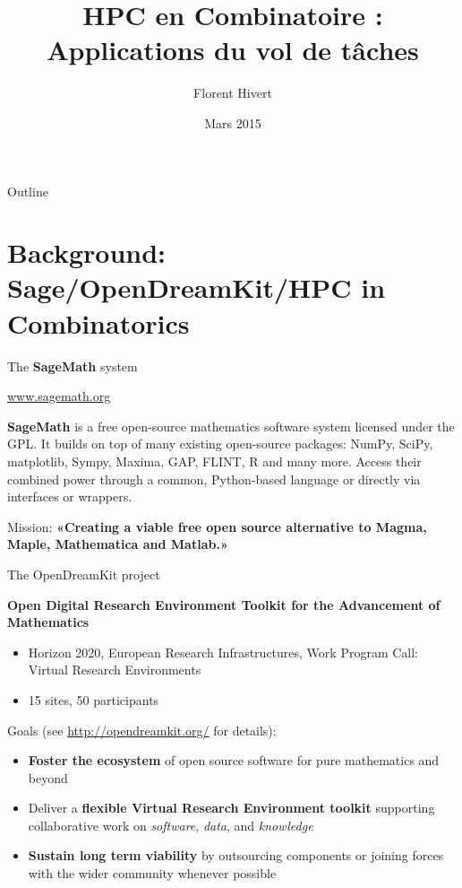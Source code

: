 \documentclass[compress,11pt]{beamer}
\title{\bf\LARGE HPC en Combinatoire :  \\
Applications du vol de tâches\\[5mm]}
\author{Florent Hivert}
\institute[LRI]{
  LRI / Université Paris Sud 11 / CNRS}
\date[Décembre 2014]{Mars 2015}
\begin{document}
\frame{\titlepage}

\begin{frame}{Outline}

  \tableofcontents
\end{frame}


\section{Background: Sage/OpenDreamKit/HPC in Combinatorics}
\begin{frame}{The \textbf{SageMath} system}

  \centering
  \url{www.sagemath.org}
  \bigskip

  \textbf{SageMath} is a {\color{green} free open-source mathematics software}
  system licensed under the GPL. It builds on top of many existing open-source
  packages: NumPy, SciPy, matplotlib, Sympy, Maxima, GAP, FLINT, R and many
  more. Access their combined power through a common, {\color{green}
    Python}-based language or directly via interfaces or wrappers.  \bigskip

  Mission: \textbf{«Creating a {\color{red} viable free open source
      alternative} to Magma, Maple, Mathematica and Matlab.»}
\end{frame}

\begin{frame}[fragile]{The OpenDreamKit project}

  \textbf{\Large Open Digital Research Environment Toolkit for the
    Advancement of Mathematics}
  \begin{itemize}
  \item Horizon 2020, European Research Infrastructures, Work Program
    Call: Virtual Research Environments
  \item 15 sites, 50 participants
  \end{itemize}
  {\color{red} Goals} (see {\color{blue}\url{http://opendreamkit.org/}} for details):
  \begin{itemize}
  \item \textbf{Foster the ecosystem} of open source software for pure
    mathematics and beyond
  \item Deliver a \textbf{flexible Virtual Research Environment toolkit} supporting
    collaborative work on \emph{software}, \emph{data}, and \emph{knowledge}
  \item \textbf{Sustain long term viability} by outsourcing components or
    joining forces with the wider community whenever possible
  \end{itemize}
\end{frame}
\end{document}
